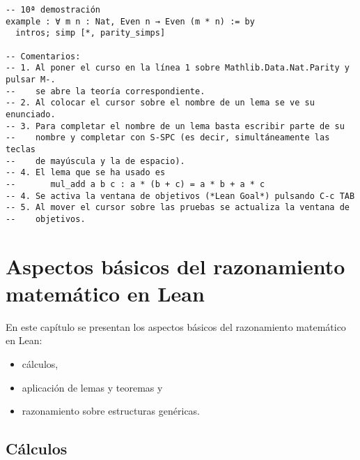 \begin{verbatim}
-- 10ª demostración
example : ∀ m n : Nat, Even n → Even (m * n) := by
  intros; simp [*, parity_simps]

-- Comentarios:
-- 1. Al poner el curso en la línea 1 sobre Mathlib.Data.Nat.Parity y pulsar M-.
--    se abre la teoría correspondiente.
-- 2. Al colocar el cursor sobre el nombre de un lema se ve su enunciado.
-- 3. Para completar el nombre de un lema basta escribir parte de su
--    nombre y completar con S-SPC (es decir, simultáneamente las teclas
--    de mayúscula y la de espacio).
-- 4. El lema que se ha usado es
--       mul_add a b c : a * (b + c) = a * b + a * c
-- 4. Se activa la ventana de objetivos (*Lean Goal*) pulsando C-c TAB
-- 5. Al mover el cursor sobre las pruebas se actualiza la ventana de
--    objetivos.
\end{verbatim}

\chapter{Aspectos básicos del razonamiento matemático en Lean}
\label{sec:org50dc1d1}

En este capítulo se presentan los aspectos básicos del razonamiento matemático
en Lean:
\begin{itemize}
\item cálculos,
\item aplicación de lemas y teoremas y
\item razonamiento sobre estructuras genéricas.
\end{itemize}

\section{Cálculos}
\label{sec:org53b6f37}

